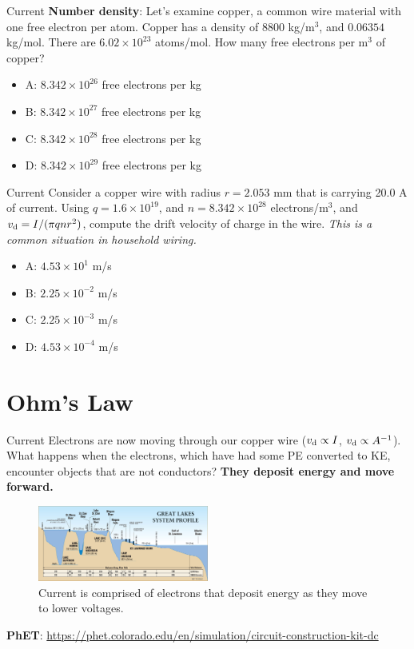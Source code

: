 \documentclass{beamer}
\begin{document}
\begin{frame}{Current}
\textbf{Number density}: Let's examine copper, a common wire material with one free electron per atom.  Copper has a density of 8800 kg/m$^3$, and $0.06354$ kg/mol.  There are $6.02 \times 10^{23}$ atoms/mol.  How many free electrons per m$^3$ of copper?
\begin{itemize}
\item A: $8.342 \times 10^{26}$ free electrons per kg
\item B: $8.342 \times 10^{27}$ free electrons per kg
\item C: $8.342 \times 10^{28}$ free electrons per kg
\item D: $8.342 \times 10^{29}$ free electrons per kg
\end{itemize}
\end{frame}

\begin{frame}{Current}
Consider a copper wire with radius $r = 2.053$ mm that is carrying 20.0 A of current.  Using $q = 1.6\times 10^{19}$, and $n = 8.342 \times 10^{28}$ electrons/m$^3$, and $v_{\rm d} = I/(\pi q n r^2)$, compute the drift velocity of charge in the wire.  \textit{This is a common situation in household wiring.}
\begin{itemize}
\item A: $4.53 \times 10^{1}$ m/s
\item B: $2.25 \times 10^{-2}$ m/s
\item C: $2.25 \times 10^{-3}$ m/s
\item D: $4.53 \times 10^{-4}$ m/s
\end{itemize}
\end{frame}

\section{Ohm's Law}

\begin{frame}{Current}
\small
Electrons are now moving through our copper wire ($v_{\rm d} \propto I$, $v_{\rm d} \propto A^{-1}$).  What happens when the electrons, which have had some PE converted to KE, encounter objects that are not conductors?  \textbf{They deposit energy and move forward.} \\ \vspace{0.5cm}
\begin{figure}
\centering
\includegraphics[width=0.5\textwidth]{figures/lakes.jpg}
\caption{\label{fig:lakes} Current is comprised of electrons that deposit energy as they move to lower voltages.}
\end{figure}
\textbf{\alert{PhET}}: \url{https://phet.colorado.edu/en/simulation/circuit-construction-kit-dc}
\end{frame}
\end{document}
